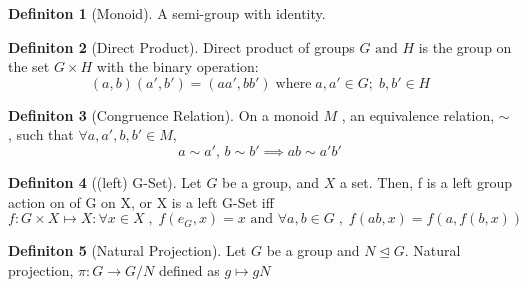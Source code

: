 \documentclass{article}
\theoremstyle{definition}
\theoremstyle{definition}
\newtheorem{definition}{Definiton}[section]
\begin{document}
\begin{definition}[Monoid] %
	A semi-group with identity.
\end{definition}

\begin{definition}[Direct Product] %
	Direct product of groups $ G \text{ and } H $ is the group on the set $ G \times H $ with the binary operation:
\[ (a,b)(a',b')=(aa',bb') \; \text{where} \; a,a' \in G; \; b,b' \in H\]
\end{definition}

\begin{definition}[Congruence Relation] %
On a monoid $ M $ , an equivalence relation, $ \sim $ , such that $ \forall a,a',b,b' \in M $,
\[ a \sim a' ,\, b\sim b' \implies ab \sim a'b'  \]
\end{definition}

\begin{definition}[(left) G-Set] %
Let $ G $ be a group, and $ X $ a set. Then, f is a left group action on of G on X, or X is a left G-Set iff
\[ f:G \times X \mapsto X : \forall x \in X \; , \;   f(e_G,x)=x \text{ and } \forall a,b \in G \; , \; f(ab,x)=f(a, f(b,x))  \]
\end{definition}

\begin{definition}[Natural Projection] %
Let $G$ be a group and $N \trianglelefteq G$. Natural projection, $\pi : G \rightarrow G/N$ defined as $g \mapsto gN$
\end{definition}
\end{document}
